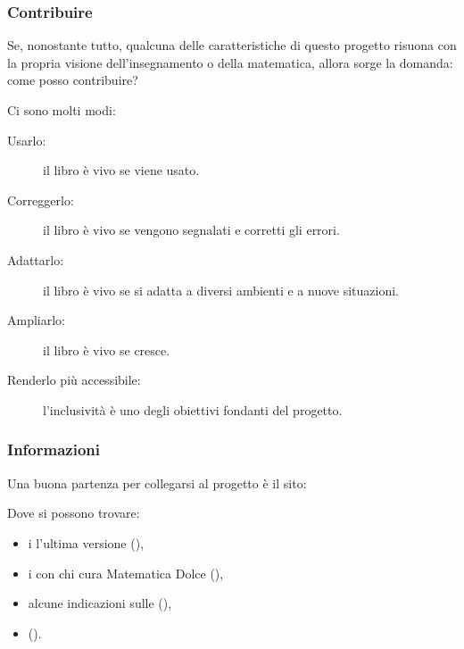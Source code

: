 \documentclass{beamer} %
\begin{document}
\begin{frame}\frametitle{Contribuire}

Se, nonostante tutto, qualcuna delle caratteristiche di questo progetto 
risuona con la propria visione dell'insegnamento o della matematica, allora 
sorge la domanda: come posso contribuire?

\vspace{1em}
Ci sono molti modi:
\spause
\begin{description}
\item [Usarlo:\hspace{10.3mm}] il libro è vivo se viene usato.
\item [Correggerlo: ] il libro è vivo se vengono segnalati e corretti gli 
errori.
\item [Adattarlo:\hspace{4mm} ] il libro è vivo se si adatta a diversi 
ambienti e a nuove situazioni.
\item [Ampliarlo:\hspace{3mm} ] il libro è vivo se cresce.
\item [Renderlo più accessibile: ] l'inclusività è uno degli obiettivi 
fondanti del progetto.
\end{description}

\end{frame}


\begin{frame}\frametitle{Informazioni}

Una buona partenza per collegarsi al progetto è il sito:

\bigskip
\begin{center}
\href{https://www.matematicadolce.eu}
     {{\huge {}}}
\end{center}

\bigskip
Dove si possono trovare:
\begin{itemize}
\item i  l'ultima versione 
(),
\item i  con chi cura Matematica Dolce
(),
\item alcune indicazioni sulle 
(),
\item {}
().
\end{itemize}

\spause
\begin{center}  \end{center}

\end{frame}
\end{document}
